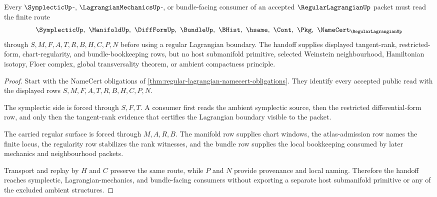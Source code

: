\begin{theorem}
\label{thm:regular-lagrangian-symplectic-handoff}
Every $\SymplecticUp$-, $\LagrangianMechanicsUp$-, or bundle-facing consumer of an accepted $\RegularLagrangianUp$ packet must read the finite route
$$
\SymplecticUp,\ \ManifoldUp,\ \DiffFormUp,\ \BundleUp,\ \BHist,\ \hsame,\ \Cont,\ \Pkg,\ \NameCert_{\RegularLagrangianUp}
$$
through $S,M,F,A,T,R,B,H,C,P,N$ before using a regular Lagrangian boundary. The handoff supplies displayed tangent-rank, restricted-form, chart-regularity, and bundle-bookkeeping rows, but no host submanifold primitive, selected Weinstein neighbourhood, Hamiltonian isotopy, Floer complex, global transversality theorem, or ambient compactness principle.
\end{theorem}
\begin{proof}
Start with the NameCert obligations of \autoref{thm:regular-lagrangian-namecert-obligations}. They identify every accepted public read with the displayed rows $S,M,F,A,T,R,B,H,C,P,N$.

The symplectic side is forced through $S,F,T$. A consumer first reads the ambient symplectic source, then the restricted differential-form row, and only then the tangent-rank evidence that certifies the Lagrangian boundary visible to the packet.

The carried regular surface is forced through $M,A,R,B$. The manifold row supplies chart windows, the atlas-admission row names the finite locus, the regularity row stabilizes the rank witnesses, and the bundle row supplies the local bookkeeping consumed by later mechanics and neighbourhood packets.

Transport and replay by $H$ and $C$ preserve the same route, while $P$ and $N$ provide provenance and local naming. Therefore the handoff reaches symplectic, Lagrangian-mechanics, and bundle-facing consumers without exporting a separate host submanifold primitive or any of the excluded ambient structures.
\end{proof}



